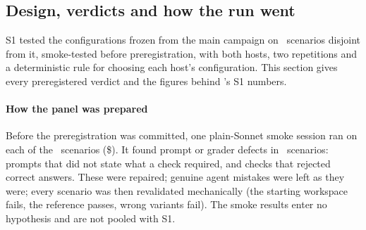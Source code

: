 \subsection{Design, verdicts and how the run went}\label{sec:s1}

S1 tested the configurations frozen from the main campaign on \SOnePanelN\ scenarios disjoint from it, smoke-tested
before preregistration, with both hosts, two repetitions and a deterministic rule for choosing each host's
configuration. This section gives every preregistered verdict and the figures behind \mainpaper{}'s S1 numbers.

\paragraph{How the panel was prepared} Before the preregistration was committed, one plain-Sonnet smoke session ran on
each of the \SmokeN\ scenarios (\$\SmokeUSD). It found prompt or grader defects in \SmokeFixed\ scenarios: prompts that
did not state what a check required, and checks that rejected correct answers. These were repaired; genuine agent
mistakes were left as they were; every scenario was then revalidated mechanically (the starting workspace fails, the
reference passes, wrong variants fail). The smoke results enter no hypothesis and are not pooled with S1.

